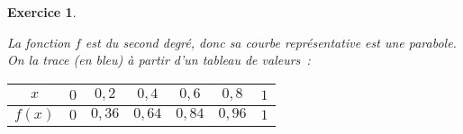 \documentclass[10pt]{article}
\newtheorem{exo}{Exercice}
\begin{document}
\begin{exo}
\begin{enumerate}
\medskip

\setlength{\columnseprule}{1pt}

\begin{multicols}{2}
La fonction $f$ est du second degré, donc sa courbe représentative est une parabole. On la trace (en bleu) à partir d'un tableau de valeurs~:

\medskip

\begin{center}
\begin{tabular}{|c|c|c|c|c|c|c|}
\hline
   $x$ &$0$ &$0,2$ &$0,4$ &$0,6$ &$0,8$&$1$ \\
	\hline
	$f(x)$ &$0$ &$0,36$ &$0,64$ &$0,84$ &$0,96$&$1$ \\
	\hline
\end{tabular}
\end{center}

\medskip



\end{multicols}
\end{enumerate}
\end{exo}
\end{document}
